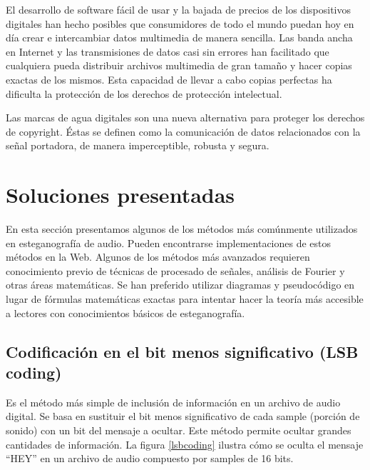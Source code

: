 \documentclass[12pt]{article}
\begin{document}
El desarrollo de software fácil de usar y la bajada de precios de los dispositivos digitales han hecho posibles que consumidores de todo el mundo puedan hoy en día crear e intercambiar datos multimedia de manera sencilla. Las banda ancha en Internet y las transmisiones de datos casi sin errores han facilitado que cualquiera pueda distribuir archivos multimedia de gran tamaño y hacer copias exactas de los mismos. Esta capacidad de llevar a cabo copias perfectas ha dificulta la protección de los derechos de protección intelectual.

Las marcas de agua digitales son una nueva alternativa para proteger los derechos de copyright. Éstas se definen como la comunicación de datos relacionados con la señal portadora, de manera imperceptible, robusta y segura.

\section{Soluciones presentadas}

En esta sección presentamos algunos de los métodos más comúnmente utilizados en esteganografía de audio. Pueden encontrarse implementaciones de estos métodos en la Web. Algunos de los métodos más avanzados requieren conocimiento previo de técnicas de procesado de señales, análisis de Fourier y otras áreas matemáticas. Se han preferido utilizar diagramas y pseudocódigo en lugar de fórmulas matemáticas exactas para intentar hacer la teoría más accesible a lectores con conocimientos básicos de esteganografía.

\subsection{Codificación en el bit menos significativo (LSB coding)}

Es el método más simple de inclusión de información en un archivo de audio digital. Se basa en sustituir el bit menos significativo de cada sample (porción de sonido) con un bit del mensaje a ocultar. Este método permite ocultar grandes cantidades de información. La figura \ref{lsbcoding} ilustra cómo se oculta el mensaje ``HEY'' en un archivo de audio compuesto por samples de 16 bits.
\end{document}
